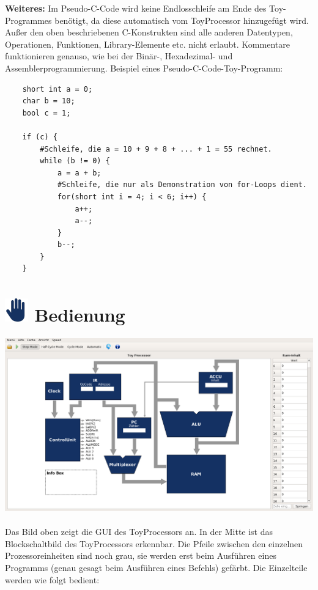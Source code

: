 \documentclass{article}
\begin{document}
\noindent \textbf{Weiteres:}
Im Pseudo-C-Code wird keine Endlosschleife am Ende des Toy-Programmes benötigt,
da diese automatisch vom ToyProcessor hinzugefügt wird. Außer den oben
beschriebenen C-Konstrukten sind alle anderen Datentypen, Operationen,
Funktionen, Library-Elemente etc. nicht erlaubt. Kommentare funktionieren
genauso, wie bei der Binär-, Hexadezimal- und Assemblerprogrammierung. Beispiel eines Pseudo-C-Code-Toy-Programm:
\begin{lstlisting}
    short int a = 0;
    char b = 10;
    bool c = 1;

    if (c) {
        #Schleife, die a = 10 + 9 + 8 + ... + 1 = 55 rechnet.
        while (b != 0) {
            a = a + b;
            #Schleife, die nur als Demonstration von for-Loops dient.
            for(short int i = 4; i < 6; i++) {
                a++;
                a--;
            }
            b--;
        }
    }
\end{lstlisting}

\section*{\includegraphics[width=1cm]{./icon_bedienung.png}
\hspace{0.25cm} Bedienung}

\includegraphics[width=\textwidth]{./picture_gui.png}\\\\
\noindent Das Bild oben zeigt die GUI des ToyProcessors an. In der Mitte ist das Blockschaltbild des ToyProcessors erkennbar. Die Pfeile zwischen den
einzelnen Prozessoreinheiten sind noch grau, sie werden erst beim Ausführen eines Programms (genau gesagt
beim Ausführen eines Befehls) gefärbt. Die Einzelteile werden wie folgt bedient:\\
\end{document}
